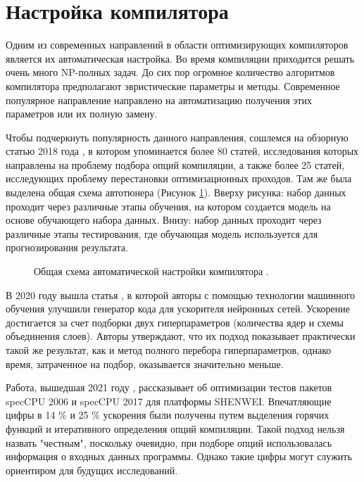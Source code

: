  
\section{Настройка компилятора} \label{pr:tuning}

Одним из современных направлений в области оптимизирующих компиляторов является их автоматическая настройка. Во время компиляции приходится решать очень много NP-полных задач. До сих пор огромное количество алгоритмов компилятора предполагают эвристические параметры и методы. Современное популярное направление направлено на автоматизацию получения этих параметров или их полную замену\cite{leather2020machine}.

Чтобы подчеркнуть популярность данного направления, сошлемся на обзорную статью 2018 года \cite{ashouri2018survey}, в котором упоминается более 80 статей, исследования которых направлены на проблему подбора опций компиляции, а также более 25 статей, исследующих проблему перестановки оптимизационных проходов. Там же была выделена общая схема автотюнера (Рисунок \ref{partReview:ml_for_comp1}). Вверху рисунка: набор данных проходит через различные этапы обучения, на котором создается модель на основе обучающего набора данных. Внизу: набор данных проходит через различные этапы тестирования, где обучающая модель используется для прогнозирования результата.  

 \begin{figure}[htbp]
	\centering
	
	\caption{Общая схема автоматической настройки компилятора \cite{ashouri2018survey}.}
	\label{partReview:ml_for_comp1}
\end{figure}

В 2020 году вышла статья \cite{liu2020dlfusion}, в которой авторы с помощью технологии машинного обучения улучшили генератор кода для ускорителя нейронных сетей. Ускорение достигается за счет подборки двух гиперпараметров (количества ядер и схемы объединения слоев). Авторы утверждают, что их подход показывает практически такой же результат, как и метод полного перебора гиперпараметров, однако время, затраченное на подбор, оказывается значительно меньше. 

Работа, вышедшая 2021 году \cite{wei2021compiler}, рассказывает об оптимизации тестов пакетов specCPU 2006 и specCPU 2017 для платформы SHENWEI. Впечатляющие цифры в 14 \% и 25 \% ускорения были получены путем выделения горячих функций и итеративного определения опций компиляции. Такой подход нельзя назвать "честным", поскольку очевидно, при подборе опций использовалась информация о входных данных программы. Однако такие цифры могут служить ориентиром для будущих исследований. 

